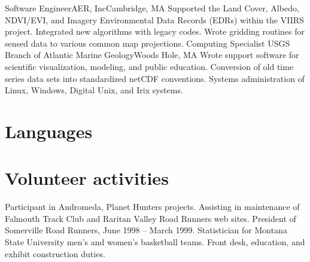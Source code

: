 \documentclass[11pt,a4paper,sans]{moderncv}
\begin{document}
    {Software Engineer}{AER, Inc}{Cambridge, MA}{}
      {Supported the Land Cover, Albedo, NDVI/EVI, and
      Imagery Environmental Data Records (EDRs) within the VIIRS
      project. Integrated new algorithms with legacy codes. Wrote gridding
      routines for sensed data to various common map projections.}
    {Computing Specialist}
    {USGS Branch of Atlantic Marine Geology}{Woods Hole, MA}{}
      {Wrote support software for scientific visualization, modeling,
      and public education. Conversion of old time series data sets into
      standardized netCDF conventions.  Systems administration of Linux,
      Windows, Digital Unix, and Irix systems.}

\section{Languages}

\section{Volunteer activities}
  {Participant in Andromeda, Planet Hunters projects.}
  {Assisting in maintenance of Falmouth Track Club and Raritan Valley
   Road Runners web sites.
   President of Somerville Road Runners, June 1998 -- March 1999.}
  {Statistician for Montana State University men's and women's basketball
  teams.}
  {Front desk, education, and exhibit construction duties.}
\end{document}
